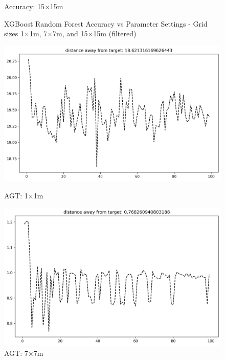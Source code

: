 \documentclass[runningheads]{llncs}
\begin{document}
\begin{figure}[H]
\begin{minipage}{0.32\textwidth}
		\caption*{Accuracy: 15×15m}
	\end{minipage}
	\caption{XGBoost Random Forest Accuracy vs Parameter Settings - Grid sizes 1×1m, 7×7m, and 15×15m (filtered)}
\end{figure}

\begin{figure}[H]
	\centering
	\begin{minipage}{0.32\textwidth}
		\centering
		\includegraphics[width=\textwidth]{figures/xgbrf_custom_1.png}
		\caption*{AGT: 1×1m}
	\end{minipage}
	\hfill
	\begin{minipage}{0.32\textwidth}
		\centering
		\includegraphics[width=\textwidth]{figures/xgbrf_custom_7.png}
		\caption*{AGT: 7×7m}
	\end{minipage}
	\hfill
	\begin{minipage}{0.32\textwidth}
		\centering

\end{minipage}
\end{figure}
\end{document}
